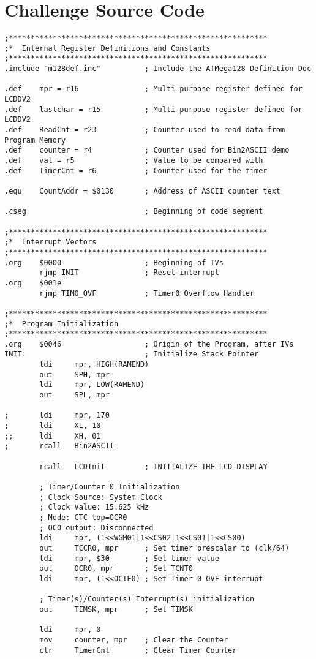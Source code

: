 \documentclass[12pt,letterpaper]{article}
\begin{document}
\pagebreak

\section{Challenge Source Code}

\begin{verbatim}
;***********************************************************
;*	Internal Register Definitions and Constants
;***********************************************************
.include "m128def.inc"			; Include the ATMega128 Definition Doc

.def	mpr = r16				; Multi-purpose register defined for LCDDV2
.def	lastchar = r15			; Multi-purpose register defined for LCDDV2
.def	ReadCnt = r23			; Counter used to read data from Program Memory
.def	counter = r4			; Counter used for Bin2ASCII demo
.def	val = r5				; Value to be compared with
.def	TimerCnt = r6			; Counter used for the timer

.equ	CountAddr = $0130		; Address of ASCII counter text

.cseg							; Beginning of code segment

;***********************************************************
;*	Interrupt Vectors
;***********************************************************
.org	$0000					; Beginning of IVs
		rjmp INIT				; Reset interrupt
.org	$001e	
		rjmp TIM0_OVF			; Timer0 Overflow Handler

;***********************************************************
;*	Program Initialization 
;***********************************************************
.org	$0046					; Origin of the Program, after IVs
INIT:							; Initialize Stack Pointer
		ldi		mpr, HIGH(RAMEND)
		out		SPH, mpr
		ldi		mpr, LOW(RAMEND)
		out		SPL, mpr

;		ldi		mpr, 170
;		ldi		XL, 10
;;		ldi		XH, 01
;		rcall   Bin2ASCII

		rcall	LCDInit			; INITIALIZE THE LCD DISPLAY

		; Timer/Counter 0 Initialization
		; Clock Source: System Clock
		; Clock Value: 15.625 kHz
		; Mode: CTC top=OCR0
		; OC0 output: Disconnected
		ldi		mpr, (1<<WGM01|1<<CS02|1<<CS01|1<<CS00)	
		out		TCCR0, mpr		; Set timer prescalar to (clk/64)
		ldi		mpr, $30		; Set timer value
		out		OCR0, mpr		; Set TCNT0
		ldi		mpr, (1<<OCIE0)	; Set Timer 0 OVF interrupt

		; Timer(s)/Counter(s) Interrupt(s) initialization
		out		TIMSK, mpr		; Set TIMSK

		ldi		mpr, 0
		mov		counter, mpr	; Clear the Counter
		clr		TimerCnt		; Clear Timer Counter


\end{verbatim}
\end{document}
